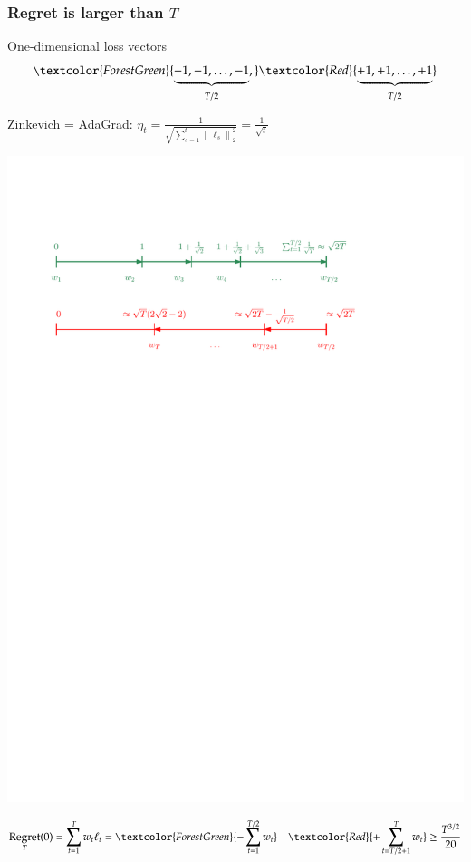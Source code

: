 \documentclass[usenames,dvipsnames]{beamer}
\DeclareMathOperator{\Regret}{Regret}
\newcommand{\norm}[1]{\left\|#1\right\|}
\begin{document}
\begin{frame}
\frametitle{Regret is larger than $T$}

One-dimensional loss vectors
$$
\textcolor{ForestGreen}{\underbrace{-1, -1, \dots, -1}_{T/2},} \textcolor{Red}{\underbrace{+1, +1, \dots, +1}_{T/2}}
$$

Zinkevich = AdaGrad: $\eta_t = \frac{1}{\sqrt{\sum_{s=1}^t \norm{\ell_s}_2^2}} = \frac{1}{\sqrt{t}}$

\begin{center}
\includegraphics[scale=0.5]{gd-lower-bound}
\end{center}

$$
\Regret_T(0) = \sum_{t=1}^T w_t \ell_t = \textcolor{ForestGreen}{-\sum_{t=1}^{T/2} w_t} \quad \textcolor{Red}{+ \sum_{t={T/2+1}}^T w_t} \ge \frac{T^{3/2}}{20}
$$
\end{frame}
\end{document}
